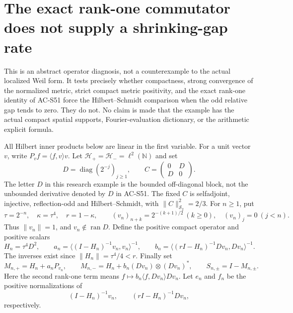 \section{The exact rank-one commutator does not supply a shrinking-gap rate}
\label{sec:spectral-parity-commutator-obstruction}

This is an abstract operator diagnosis, not a counterexample to the
actual localized Weil form.  It tests precisely whether compactness,
strong convergence of the normalized metric, strict compact metric
positivity, and the exact rank-one identity of AC-S51 force the
Hilbert--Schmidt comparison when the odd relative gap tends to zero.
They do not.  No claim is made that the example has the actual compact
spatial supports, Fourier-evaluation dictionary, or the arithmetic
explicit formula.

All Hilbert inner products below are linear in the first variable.
For a unit vector \(v\), write \(P_v f=\langle f,v\rangle v\).
Let \(\mathcal H_+=\mathcal H_-=\ell^2(\mathbb N)\) and set
\[
 D=\operatorname{diag}(2^{-j})_{j\ge1},\qquad
 C=\begin{pmatrix}0&D\\D&0\end{pmatrix}.
 \tag{PA.1}
\]
The letter \(D\) in this research example is the bounded off-diagonal
block, not the unbounded derivative denoted by \(D\) in AC-S51.
The fixed \(C\) is selfadjoint, injective, reflection-odd and
Hilbert--Schmidt, with \(\|C\|_{\mathcal S_2}^2=2/3\).
For \(n\ge1\), put
\[
 \tau=2^{-n},\quad \kappa=\tau^4,\quad r=1-\kappa,
 \qquad
 (v_n)_{n+k}=2^{-(k+1)/2}\ (k\ge0),
 \quad (v_n)_j=0\ (j<n).
 \tag{PA.2}
\]
Thus \(\|v_n\|=1\), and \(v_n\notin\operatorname{ran}D\).
Define the positive compact operator and positive scalars
\[
 H_n=\tau^4D^2,\qquad
 a_n=\langle (I-H_n)^{-1}v_n,v_n\rangle^{-1},\qquad
 b_n=\langle (rI-H_n)^{-1}Dv_n,Dv_n\rangle^{-1}.
 \tag{PA.3}
\]
The inverses exist since
\(\|H_n\|=\tau^4/4<r\).  Finally set
\[
 M_{n,+}=H_n+a_nP_{v_n},\qquad
 M_{n,-}=H_n+b_n(Dv_n)\otimes(Dv_n)^*,\qquad
 S_{n,\pm}=I-M_{n,\pm}.
 \tag{PA.4}
\]
Here the second rank-one term means
\(f\mapsto b_n\langle f,Dv_n\rangle Dv_n\).
Let \(e_n\) and \(f_n\) be the positive normalizations of
\[
 (I-H_n)^{-1}v_n,\qquad (rI-H_n)^{-1}Dv_n,
 \tag{PA.5}
\]
respectively.

